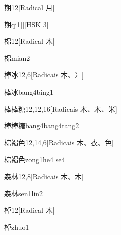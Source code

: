 \begin{entry}{期}{12}[Radical ⽉]
  \begin{phonetics}{期}{qi1}[][HSK 3]
  \end{phonetics}
\end{entry}

\begin{entry}{棉}{12}[Radical ⽊]
  \begin{phonetics}{棉}{mian2}
  \end{phonetics}
\end{entry}

\begin{entry}{棒冰}{12,6}[Radicais ⽊、⼎]
  \begin{phonetics}{棒冰}{bang4bing1}
  \end{phonetics}
\end{entry}

\begin{entry}{棒棒糖}{12,12,16}[Radicais ⽊、⽊、⽶]
  \begin{phonetics}{棒棒糖}{bang4bang4tang2}
  \end{phonetics}
\end{entry}

\begin{entry}{棕褐色}{12,14,6}[Radicais ⽊、⾐、⾊]
  \begin{phonetics}{棕褐色}{zong1he4 se4}
  \end{phonetics}
\end{entry}

\begin{entry}{森林}{12,8}[Radicais ⽊、⽊]
  \begin{phonetics}{森林}{sen1lin2}
  \end{phonetics}
\end{entry}

\begin{entry}{棹}{12}[Radical ⽊]
  \begin{phonetics}{棹}{zhuo1}
  \end{phonetics}
\end{entry}

